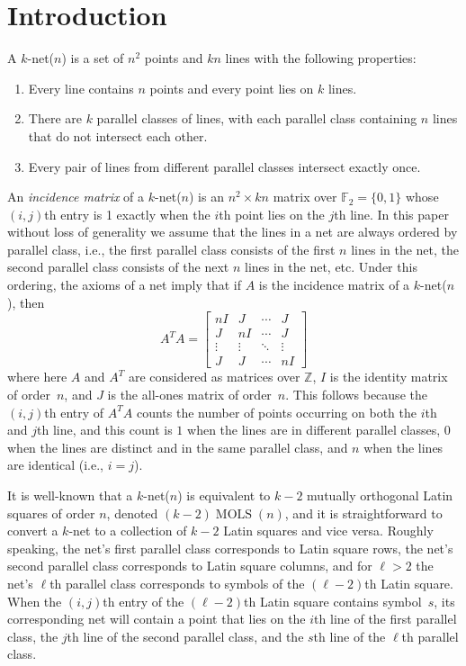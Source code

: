 \documentclass[runningheads]{llncs}
\newcommand{\F}{\mathbb{F}}
\newcommand{\Z}{\mathbb{Z}}
\newcommand{\MOLS}[2]{#1\operatorname{MOLS}(#2)}
\begin{document}
\section{Introduction}

A $k$-net($n$) is a set of $n^2$ points and $kn$ lines with the following properties:

\begin{enumerate}
\item Every line contains $n$ points and every point lies on $k$ lines.
\item There are $k$ parallel classes of lines, with each parallel class containing $n$ lines
that do not intersect each other.
\item Every pair of lines from different parallel classes intersect exactly once.
\end{enumerate}
An \emph{incidence matrix} of a $k$-net($n$) is an $n^2\times kn$ matrix over $\F_2=\{0,1\}$ whose
$(i,j)$th entry is 1 exactly when the $i$th point lies on the $j$th line.
In this paper without loss of generality we assume that the lines in a net are always ordered
by parallel class, i.e., the first parallel class consists of the first
$n$ lines in the net, the second parallel class consists of the next $n$ lines in the net, etc.
Under this ordering, the axioms of a net imply that if $A$ is the incidence matrix of a $k$-net($n$), then
\begin{equation}
A^TA = \begin{bmatrix}
nI & J & \cdots & J \\
J & nI & \cdots & J \\
\vdots & \vdots & \ddots & \vdots \\
J & J & \cdots & nI
\end{bmatrix}
\end{equation}
where here $A$ and $A^T$ are considered as matrices over $\Z$,
$I$ is the identity matrix of order~$n$, and $J$ is the all-ones matrix of order~$n$.
This follows because the $(i,j)$th entry of $A^TA$ counts the number of points occurring
on both the $i$th and $j$th line, and this count is $1$ when the lines are in different parallel
classes, $0$ when the lines are distinct and in the same parallel class, and $n$ when the lines
are identical (i.e., $i=j$).

It is well-known that a $k$-net($n$) is equivalent to $k-2$ mutually orthogonal Latin squares of order $n$, denoted $\MOLS{(k-2)}{n}$,
and it is straightforward to convert a $k$-net to a collection of $k-2$ Latin squares and vice versa.
Roughly speaking, the net's first parallel class corresponds to Latin square rows, the net's second parallel class corresponds to
Latin square columns, and for $\ell>2$ the net's $\ell$th parallel class corresponds to symbols
of the $(\ell-2)$th Latin square.
When the $(i,j)$th entry of the $(\ell-2)$th Latin square contains symbol~$s$, its corresponding
net will contain a point that lies on the $i$th line of the first parallel class,
the $j$th line of the second parallel class, and the $s$th line
of the $\ell$th parallel class.
\end{document}
